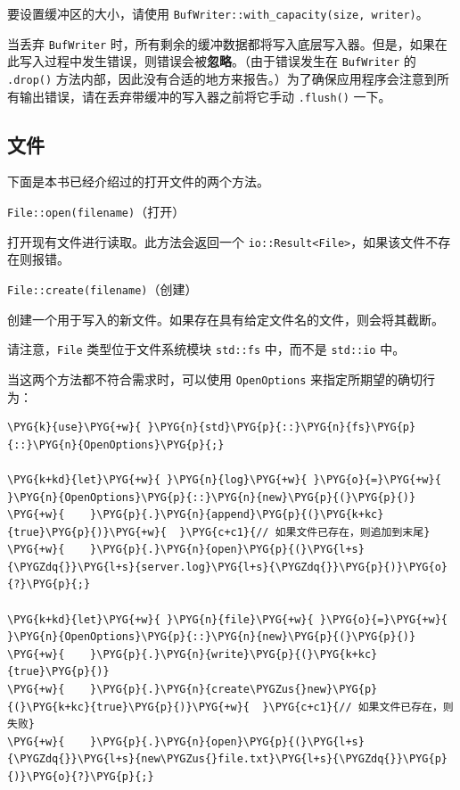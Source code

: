 要设置缓冲区的大小，请使用 \texttt{BufWriter::with\_capacity(size, writer)}。

当丢弃 \texttt{BufWriter} 时，所有剩余的缓冲数据都将写入底层写入器。但是，如果在此写入过程中发生错误，则错误会被\textbf{忽略}。（由于错误发生在 \texttt{BufWriter} 的 \texttt{.drop()} 方法内部，因此没有合适的地方来报告。）为了确保应用程序会注意到所有输出错误，请在丢弃带缓冲的写入器之前将它手动 \texttt{.flush()} 一下。

\subsection{文件}

下面是本书已经介绍过的打开文件的两个方法。

\begin{mySidenote}
\texttt{File::open(filename)}（打开）
\end{mySidenote}

打开现有文件进行读取。此方法会返回一个 \texttt{io::Result<File>}，如果该文件不存在则报错。

\begin{mySidenote}
\texttt{File::create(filename)}（创建）
\end{mySidenote}

创建一个用于写入的新文件。如果存在具有给定文件名的文件，则会将其截断。

请注意，\texttt{File} 类型位于文件系统模块 \texttt{std::fs} 中，而不是 \texttt{std::io} 中。

当这两个方法都不符合需求时，可以使用 \texttt{OpenOptions} 来指定所期望的确切行为：

\begin{Verbatim}[commandchars=\\\{\},breaklines=true,breakanywhere=true,fontsize=\codefont,xleftmargin=17bp]
\PYG{k}{use}\PYG{+w}{ }\PYG{n}{std}\PYG{p}{::}\PYG{n}{fs}\PYG{p}{::}\PYG{n}{OpenOptions}\PYG{p}{;}

\PYG{k+kd}{let}\PYG{+w}{ }\PYG{n}{log}\PYG{+w}{ }\PYG{o}{=}\PYG{+w}{ }\PYG{n}{OpenOptions}\PYG{p}{::}\PYG{n}{new}\PYG{p}{(}\PYG{p}{)}
\PYG{+w}{    }\PYG{p}{.}\PYG{n}{append}\PYG{p}{(}\PYG{k+kc}{true}\PYG{p}{)}\PYG{+w}{  }\PYG{c+c1}{// 如果文件已存在，则追加到末尾}
\PYG{+w}{    }\PYG{p}{.}\PYG{n}{open}\PYG{p}{(}\PYG{l+s}{\PYGZdq{}}\PYG{l+s}{server.log}\PYG{l+s}{\PYGZdq{}}\PYG{p}{)}\PYG{o}{?}\PYG{p}{;}

\PYG{k+kd}{let}\PYG{+w}{ }\PYG{n}{file}\PYG{+w}{ }\PYG{o}{=}\PYG{+w}{ }\PYG{n}{OpenOptions}\PYG{p}{::}\PYG{n}{new}\PYG{p}{(}\PYG{p}{)}
\PYG{+w}{    }\PYG{p}{.}\PYG{n}{write}\PYG{p}{(}\PYG{k+kc}{true}\PYG{p}{)}
\PYG{+w}{    }\PYG{p}{.}\PYG{n}{create\PYGZus{}new}\PYG{p}{(}\PYG{k+kc}{true}\PYG{p}{)}\PYG{+w}{  }\PYG{c+c1}{// 如果文件已存在，则失败}
\PYG{+w}{    }\PYG{p}{.}\PYG{n}{open}\PYG{p}{(}\PYG{l+s}{\PYGZdq{}}\PYG{l+s}{new\PYGZus{}file.txt}\PYG{l+s}{\PYGZdq{}}\PYG{p}{)}\PYG{o}{?}\PYG{p}{;}
\end{Verbatim}

